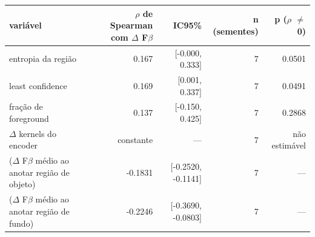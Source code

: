 \begin{tabular}{lrrrr}
\hline
variável & $\rho$ de Spearman com $\Delta$ F$\beta$ & IC95\% & n (sementes) & p ($\rho$ $\neq$ 0) \\
\hline
entropia da região & 0.167 & [-0.000, 0.333] & 7 & 0.0501 \\
least confidence & 0.169 & [0.001, 0.337] & 7 & 0.0491 \\
fração de foreground & 0.137 & [-0.150, 0.425] & 7 & 0.2868 \\
$\Delta$ kernels do encoder & constante & --- & 7 & não estimável \\
($\Delta$ F$\beta$ médio ao anotar região de objeto) & -0.1831 & [-0.2520, -0.1141] & 7 & --- \\
($\Delta$ F$\beta$ médio ao anotar região de fundo) & -0.2246 & [-0.3690, -0.0803] & 7 & --- \\
\hline
\end{tabular}
